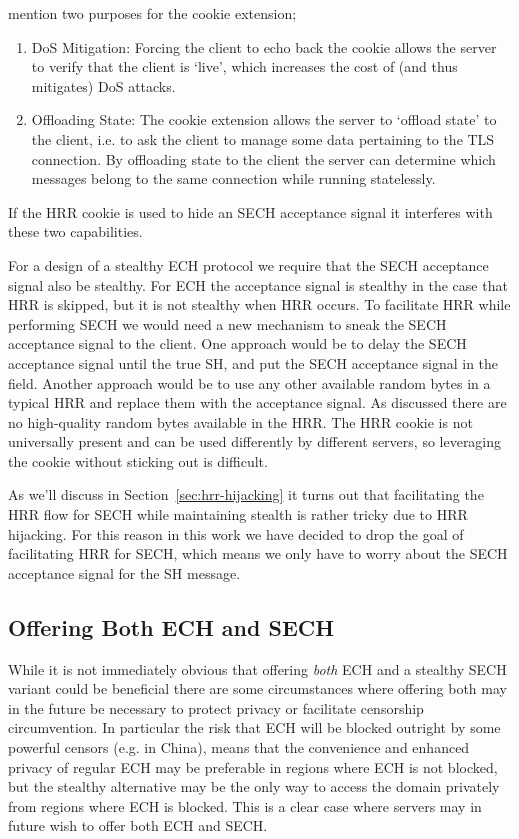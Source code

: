 \cite{rfc8446} mention two purposes for the cookie extension;
\begin{enumerate}
    \item \ac{DoS} Mitigation: Forcing the client to echo back the cookie allows the server to verify that the client is `live', which increases the cost of (and thus mitigates) \ac{DoS} attacks.
    \item Offloading State: The cookie extension allows the server to `offload state' to the client, i.e. to ask the client to manage some data pertaining to the \ac{TLS} connection. By offloading state to the client the server can determine which messages belong to the same connection while running statelessly.
\end{enumerate}
If the \ac{HRR} cookie is used to hide an \ac{SECH} acceptance signal it interferes with these two capabilities.


For a design of a stealthy \ac{ECH} protocol we require that the \ac{SECH} acceptance signal also be stealthy.
For \ac{ECH} the acceptance signal is stealthy in the case that \ac{HRR} is skipped, but it is not stealthy when \ac{HRR} occurs.
To facilitate \ac{HRR} while performing \ac{SECH}
we would need a new mechanism to sneak the \ac{SECH} acceptance signal to the client.
One approach would be to delay the SECH acceptance signal until the true \ac{SH},
and put the \ac{SECH} acceptance signal
in the  field.
Another approach would be to use any other available random bytes in a typical \ac{HRR} and replace them with the acceptance signal.
As discussed there are no high-quality random bytes available
in the \ac{HRR}.
The \ac{HRR} cookie is not universally
present and can be used differently by different servers,
so leveraging the cookie without sticking out is difficult.

As we'll discuss in Section~\ref{sec:hrr-hijacking}
it turns out that facilitating the \ac{HRR} flow
for \ac{SECH} while maintaining stealth
is rather tricky due to \ac{HRR} hijacking.
For this reason in this work we have decided to drop the
goal of facilitating \ac{HRR} for \ac{SECH},
which means we only have to worry about
the \ac{SECH} acceptance signal
for the \ac{SH} message.



\subsection{Offering Both ECH and SECH}
While it is not immediately obvious that offering {\em both} \ac{ECH} and a stealthy \ac{SECH} variant could be beneficial there are some circumstances where offering both may in the future be necessary to protect privacy or facilitate censorship circumvention.
In particular the risk that \ac{ECH} will be blocked outright by some powerful censors (e.g. in China),
means that the convenience and enhanced privacy of regular ECH may be preferable in regions where ECH is not blocked,
but the stealthy alternative may be the only way to access the domain privately from regions where \ac{ECH} is blocked.
This is a clear case where servers may in future wish to offer both \ac{ECH} and \ac{SECH}.

